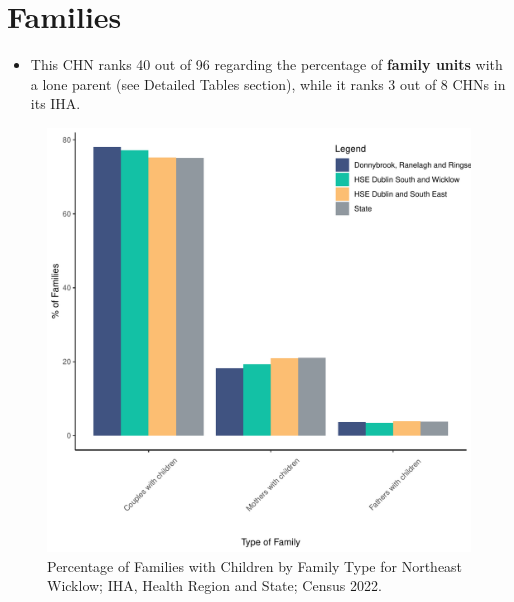 \documentclass{article}
\begin{document}
\section{Families}\label{sect:Fam}
\begin{itemize}
\item This CHN ranks  40 out of 96 regarding the percentage of \textbf{family units} with a lone parent (see Detailed Tables section), while it ranks   3 out of 8 CHNs in its IHA.
\end{itemize}
\begin{figure}[H]
	\centering
	\includegraphics[width = 150mm]{../figures/FamED.pdf}
	\caption{Percentage of Families with Children by Family Type for Northeast Wicklow; IHA, Health Region and State; Census 2022.}
	\label{fig:vbnv}
	\end{figure}
	
\end{document}
